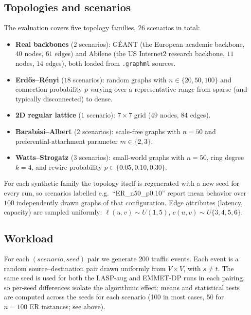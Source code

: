 \subsection{Topologies and scenarios}
\label{subsec:topologies}

The evaluation covers five topology families, $26$ scenarios in
total:

\begin{itemize}
\item \textbf{Real backbones} ($2$ scenarios): GÉANT (the European
academic backbone, $40$ nodes, $61$ edges) and Abilene (the
US Internet2 research backbone, $11$ nodes, $14$ edges), both
loaded from \texttt{.graphml} sources.
\item \textbf{Erd\H{o}s--R\'enyi} ($18$ scenarios): random
graphs with $n\in\{20, 50, 100\}$ and connection probability
$p$ varying over a representative range from sparse (and
typically disconnected) to dense.
\item \textbf{2D regular lattice} ($1$ scenario): $7\times 7$ grid
($49$ nodes, $84$ edges).
\item \textbf{Barab\'asi--Albert} ($2$ scenarios): scale-free
graphs with $n=50$ and preferential-attachment parameter $m\in\{2, 3\}$.
\item \textbf{Watts--Strogatz} ($3$ scenarios): small-world graphs
with $n=50$, ring degree $k=4$, and rewire probability
$p\in\{0.05, 0.10, 0.30\}$.
\end{itemize}

For each synthetic family the topology itself is regenerated with a
new seed for every run, so scenarios labelled e.g.\ ``ER\_n50\_p0.10''
report mean behavior over $100$ independently drawn graphs of that
configuration. Edge attributes (latency, capacity) are sampled
uniformly: $\ell(u,v)\sim U(1,5)$, $c(u,v)\sim U\{3,4,5,6\}$.

\subsection{Workload}
\label{subsec:workload}

For each $(scenario, seed)$ pair we generate $200$ traffic events.
Each event is a random source--destination pair drawn uniformly from
$V\times V$, with $s\ne t$. The same seed is used for both the
LASP-aug and EMMET-DP runs in each pairing, so per-seed differences
isolate the algorithmic effect; means and statistical tests are
computed across the seeds for each scenario (100 in most cases, 50 for $n=100$ ER instances; see above).

